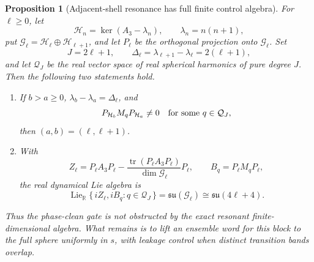 \documentclass[11pt]{article}
\newtheorem{proposition}[theorem]{Proposition}
\theoremstyle{remark}
\begin{document}
\begin{proposition}[Adjacent-shell resonance has full finite control algebra]
\label{prop:adjacent-shell-full-lie-algebra}
For $\ell\geq0$, let
\[
 \mathcal H_n=\ker(A_3-\lambda_n),\qquad
 \lambda_n=n(n+1),
\]
put $\mathcal G_\ell=\mathcal H_\ell\oplus\mathcal H_{\ell+1}$, and let
$P_\ell$ be the orthogonal projection onto $\mathcal G_\ell$.  Set
\[
 J=2\ell+1,\qquad
 \Delta_\ell=\lambda_{\ell+1}-\lambda_\ell=2(\ell+1),
\]
and let $\mathcal Q_J$ be the real vector space of real spherical harmonics
of pure degree $J$.  Then the following two statements hold.

\begin{enumerate}
\item If $b>a\geq0$, $\lambda_b-\lambda_a=\Delta_\ell$, and
\[
 P_{\mathcal H_b}M_qP_{\mathcal H_a}\neq0
 \quad\hbox{for some }q\in\mathcal Q_J,
\]
then $(a,b)=(\ell,\ell+1)$.

\item With
\[
 Z_\ell=
 P_\ell A_3P_\ell
 -\frac{\operatorname{tr}(P_\ell A_3P_\ell)}
        {\dim\mathcal G_\ell}P_\ell,
 \qquad
 B_q=P_\ell M_qP_\ell,
\]
the real dynamical Lie algebra is
\begin{equation}
 \operatorname{Lie}_{\mathbb R}
 \{\,iZ_\ell,iB_q:q\in\mathcal Q_J\,\}
 =
 \mathfrak{su}(\mathcal G_\ell)
 \cong\mathfrak{su}(4\ell+4).
 \label{eq:adjacent-shell-full-su}
\end{equation}
\end{enumerate}
Thus the phase-clean gate is not obstructed by the exact resonant
finite-dimensional algebra.  What remains is to lift an ensemble word for
this block to the full sphere uniformly in $s$, with leakage control when
distinct transition bands overlap.
\end{proposition}
\end{document}
